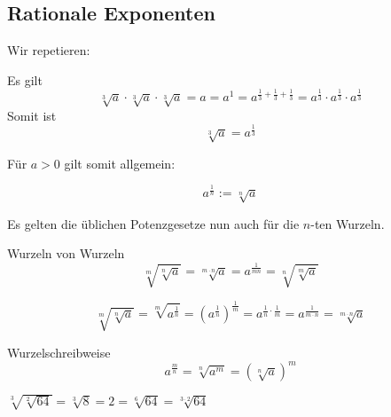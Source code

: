 \newpage


\subsection{Rationale Exponenten}

Wir repetieren:



\begin{beispiel}{}{}
Es gilt
$$\sqrt[3]{a} \cdot{}\sqrt[3]{a} \cdot{}\sqrt[3]{a} = a = a^1 =
a^{\frac13 +\frac13 +\frac13} = a^\frac13 \cdot{} a^\frac13 \cdot
a^\frac13$$
Somit ist
$$\sqrt[3]{a} = a^\frac13$$
\end{beispiel}


Für $a > 0$ gilt somit allgemein:

\begin{definition}{}{}
  $$a^{\frac{1}{n}} := \sqrt[n]{a}$$
\end{definition}


Es gelten die üblichen Potenzgesetze nun auch für die $n$-ten
Wurzeln.


\begin{gesetz}{Wurzeln von Wurzeln}{}
  $$\sqrt[m]{\sqrt[n]{a}} = \sqrt[m\cdot n]{a}=a^\frac1{mn} = \sqrt[n]{\sqrt[m]{a}}$$
\end{gesetz}


$$\sqrt[m]{\sqrt[n]{a}} =
\sqrt[m]{a^\frac{1}{n}}
= (a^{\frac{1}{n}})^{\frac{1}{m}} =
a^{\frac{1}{n}\cdot\frac{1}{m}} = a^{\frac{1}{m\cdot n}} =
\sqrt[m\cdot n]{a}$$


\begin{gesetz}{Wurzelschreibweise}{}
$$a^\frac{m}n = \sqrt[n]{a^m} = \left(\sqrt[n]{a}\right)^m$$
\end{gesetz}
\newpage



\begin{beispiel}{}{}
$\sqrt[3]{\sqrt[2]{64}} =
    \sqrt[3]{8} = 2 = \sqrt[6]{64} = \sqrt[3\cdot2]{64}$
\end{beispiel}


